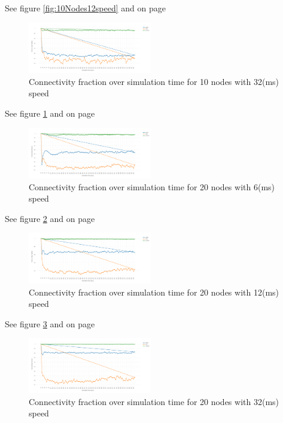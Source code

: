 \documentclass[letterpaper, 10 pt, conference]{ieeeconf}  %
\begin{document}
See figure \ref{fig:10Nodes12speed} and on page \pageref{fig:10Nodes12speed}



\begin{figure}[H]
\includegraphics[width=0.48\textwidth]{10Nodes32speed}
\caption{Connectivity fraction over simulation time for 10 nodes with 32(ms) speed}
\label{fig:10Nodes32speed}
\end{figure}

See figure \ref{fig:10Nodes32speed} and on page \pageref{fig:10Nodes32speed}


\begin{figure}[H]
\includegraphics[width=0.48\textwidth]{20Nodes06speed}
\caption{Connectivity fraction over simulation time for 20 nodes with 6(ms) speed}
\label{fig:20Nodes06speed}
\end{figure}

See figure \ref{fig:20Nodes06speed} and on page \pageref{fig:20Nodes06speed}




\begin{figure}[H]
\includegraphics[width=0.48\textwidth]{20Nodes12speed}
\caption{Connectivity fraction over simulation time for 20 nodes with 12(ms) speed}
\label{fig:20Nodes12speed}
\end{figure}

See figure \ref{fig:20Nodes12speed} and on page \pageref{fig:20Nodes12speed}



\begin{figure}[H]
\includegraphics[width=0.48\textwidth]{20Nodes32speed}
\caption{Connectivity fraction over simulation time for 20 nodes with 32(ms) speed}
\label{fig:20Nodes32speed}
\end{figure}
\end{document}
